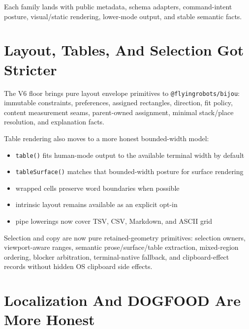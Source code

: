 Each family lands with public metadata, schema adapters, command-intent posture, visual/static rendering, lower-mode output, and stable semantic facts.

\section{Layout, Tables, And Selection Got Stricter}\label{record-281-layout-tables-and-selection-got-stricter}

The V6 floor brings pure layout envelope primitives to \texttt{@\allowbreak{}f\allowbreak{}l\allowbreak{}y\allowbreak{}i\allowbreak{}n\allowbreak{}g\allowbreak{}r\allowbreak{}o\allowbreak{}b\allowbreak{}o\allowbreak{}t\allowbreak{}s\allowbreak{}/\allowbreak{}b\allowbreak{}i\allowbreak{}j\allowbreak{}o\allowbreak{}u}: immutable constraints, preferences, assigned rectangles, direction, fit policy, content measurement seams, parent-owned assignment, minimal stack/place resolution, and explanation facts.

Table rendering also moves to a more honest bounded-width model:

\begin{itemize}
\tightlist
\item
  \texttt{t\allowbreak{}a\allowbreak{}b\allowbreak{}l\allowbreak{}e\allowbreak{}(\allowbreak{})} fits human-mode output to the available terminal width by default
\item
  \texttt{t\allowbreak{}a\allowbreak{}b\allowbreak{}l\allowbreak{}e\allowbreak{}S\allowbreak{}u\allowbreak{}r\allowbreak{}f\allowbreak{}a\allowbreak{}c\allowbreak{}e\allowbreak{}(\allowbreak{})} matches that bounded-width posture for surface rendering
\item
  wrapped cells preserve word boundaries when possible
\item
  intrinsic layout remains available as an explicit opt-in
\item
  pipe lowerings now cover TSV, CSV, Markdown, and ASCII grid
\end{itemize}

Selection and copy are now pure retained-geometry primitives: selection owners, viewport-aware ranges, semantic prose/surface/table extraction, mixed-region ordering, blocker arbitration, terminal-native fallback, and clipboard-effect records without hidden OS clipboard side effects.

\section{Localization And DOGFOOD Are More Honest}\label{record-281-localization-and-dogfood-are-more-honest}

